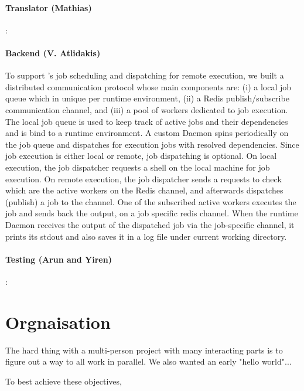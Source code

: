 \paragraph{Translator (Mathias)}:
\paragraph{Backend (V. Atlidakis)} \newline
To support \lang{}'s job scheduling and dispatching for remote execution, we
built a distributed communication protocol whose main components are: (i)
a local job queue which in unique per runtime environment, (ii) a Redis
publish/subscribe communication channel, and (iii) a pool of workers dedicated
to job execution. The local job queue is used to keep track of active jobs
and their dependencies and is bind to a runtime environment. A custom Daemon
spins periodically on the job queue and dispatches for execution jobs with
resolved dependencies. Since job execution is either local or remote, job
dispatching is optional. On local execution, the job dispatcher requests a
shell on the local machine for job execution. On remote execution, the job
dispatcher sends a requests to check which are the active workers on the Redis
channel, and afterwards dispatches (publish) a job to the channel. One of the
subscribed active workers executes the job and sends back the output, on a job
specific redis channel. When the runtime Daemon receives the output of the
dispatched job via the job-specific channel, it prints its stdout and also
saves it in a log file under current working directory.

\paragraph{Testing (Arun and Yiren)}:

\section{Orgnaisation}
The hard thing with a multi-person project with many interacting parts is to figure out a way to all work in parallel.
We also wanted an early "hello world"...

To best achieve these objectives, 
